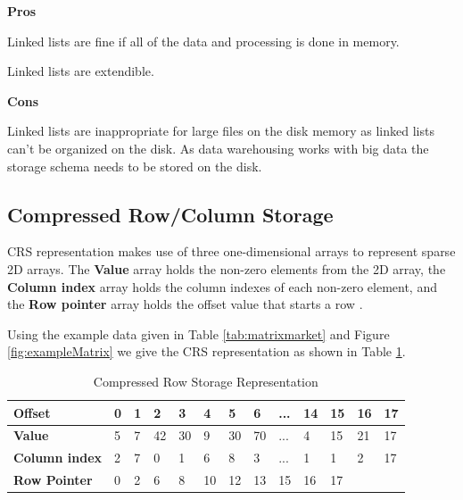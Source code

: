 \textbf{Pros}
\begin{compactitem}
	\item Linked lists are fine if all of the data and processing is done in memory.
	\item Linked lists are extendible.
\end{compactitem}

\textbf{Cons}
\begin{compactitem}
	\item Linked lists are inappropriate for large files on the disk memory as linked lists can't be organized on the disk. As data warehousing works with big data the storage schema needs to be stored on the disk. 
\end{compactitem}

\subsection{Compressed Row/Column Storage}

 CRS representation makes use of three one-dimensional arrays to represent sparse 2D arrays. The \textbf{Value} array holds the non-zero elements from the 2D array, the \textbf{Column index} array holds the column indexes of each non-zero element, and the \textbf{Row pointer} array holds the offset value that starts a row \cite{wang:2014sar}.
 
 Using the example data given in Table \ref{tab:matrixmarket} and Figure \ref{fig:exampleMatrix} we give the CRS representation as shown in Table \ref{tab:compressed}.
 
  \begin{table}[H]
 	\caption{Compressed Row Storage Representation\label{tab:compressed}}
 	\begin{center}
 		\begin{tabular}{lllllllllllll}
 			\hline
 			{\textbf{Offset}} & 0 & 1 & 2 & 3 & 4 & 5 & 6 & ...& 14 & 15 & 16 & 17\\
 			\hline
 			{\textbf{Value}} & 5 & 7 & 42 & 30 & 9 & 30 & 70 & ...& 4 & 15 & 21 & 17 \\
 			{\textbf{Column index}} & 2 & 7 & 0 & 1 & 6 & 8 & 3 & ... & 1 & 1 & 2 & 17\\
 			{\textbf{Row Pointer}} & 0 & 2 & 6 & 8 & 10 & 12 & 13 & 15 & 16 & 17 & & \\
 			\hline
 		\end{tabular}
 	\end{center}
 \end{table}

